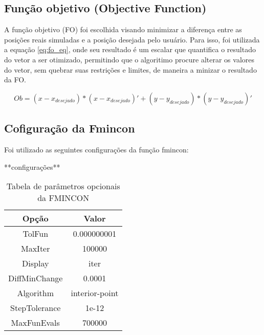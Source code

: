     
    
    
    
    
    
    
\subsection{Função objetivo (Objective Function)}
A função objetivo (FO) foi escolhida visando minimizar a diferença entre
as posições reais simuladas e a posição desejada pelo usuário.
Para isso, foi utilizada a equação \ref{eq:fo_eq}, onde seu resultado é
um escalar que quantifica o resultado do vetor a ser otimizado, permitindo
que o algoritimo procure alterar os valores do vetor, sem quebrar suas restrições e limites,
de maneira a minizar o resultado da FO.

\begin{equation}
    \label{eq:fo_eq}
    Ob = (x - x_{desejado})*(x - x_{desejado})'+(y - y_{desejado})*(y - y_{desejado})'
\end{equation}

\subsection{Cofiguração da Fmincon}
Foi utilizado as seguintes configurações da função fmincon:

**configurações**

\begin{table}
    \begin{center}
    \caption{Tabela de parâmetros opcionais da FMINCON}
    \label{tab:fmincon_options}
    \begin{tabular}{c c}
        Opção & Valor \\ \hline
        TolFun & 0.000000001 \\
        MaxIter & 100000 \\
        Display & iter \\
        DiffMinChange & 0.0001 \\
        Algorithm & interior-point \\
        StepTolerance & 1e-12 \\
        MaxFunEvals & 700000  \\ \hline
    \end{tabular}
    \end{center}
\end{table}

